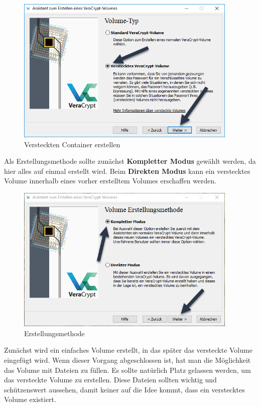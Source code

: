 \documentclass[12pt,a4paper]{scrreprt}
\begin{document}
\begin{figure}[h]
\begin{center}
\includegraphics[width=300pt]{media/createhiddencontainer.png}
\caption{Versteckten Container erstellen}
\label{createhiddencontainer}
\end{center}
\end{figure}

\noindent Als Erstellungsmethode sollte zunächst \textbf{Kompletter Modus} gewählt werden, da hier alles auf einmal erstellt wird. Beim \textbf{Direkten Modus} kann ein verstecktes Volume innerhalb eines vorher erstelltem Volumes erschaffen werden.

\begin{figure}[h]
\begin{center}
\includegraphics[width=300pt]{media/volumemode.png}
\caption{Erstellungsmethode}
\label{volumemode}
\end{center}
\end{figure}

\newpage

\noindent Zunächst wird ein einfaches Volume erstellt, in das später das versteckte Volume eingefügt wird. Wenn dieser Vorgang abgeschlossen ist, hat man die Möglichkeit das Volume mit Dateien zu füllen. Es sollte natürlich Platz gelassen werden, um das versteckte Volume zu erstellen. Diese Dateien sollten wichtig und schützenswert aussehen, damit keiner auf die Idee kommt, dass ein verstecktes Volume existiert.
\end{document}
